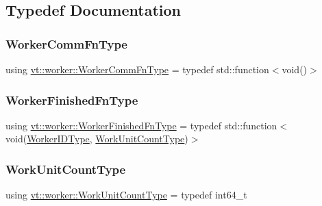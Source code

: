 \subsection{Typedef Documentation}
\mbox{\label{namespacevt_1_1worker_af5cc6dd44a4444b2e5498ca279a9f04d}} 
\subsubsection{\texorpdfstring{Worker\+Comm\+Fn\+Type}{WorkerCommFnType}}
{\footnotesize\ttfamily using \hyperlink{namespacevt_1_1worker_af5cc6dd44a4444b2e5498ca279a9f04d}{vt\+::worker\+::\+Worker\+Comm\+Fn\+Type} = typedef std\+::function$<$void()$>$}

\mbox{\label{namespacevt_1_1worker_ae32a174a5348d27aafe73c2debea1a94}} 
\subsubsection{\texorpdfstring{Worker\+Finished\+Fn\+Type}{WorkerFinishedFnType}}
{\footnotesize\ttfamily using \hyperlink{namespacevt_1_1worker_ae32a174a5348d27aafe73c2debea1a94}{vt\+::worker\+::\+Worker\+Finished\+Fn\+Type} = typedef std\+::function$<$void(\hyperlink{namespacevt_a656e362091da17b9b93d0655b36e3392}{Worker\+I\+D\+Type}, \hyperlink{namespacevt_1_1worker_a8080c49350b0520151601a8b24d6c6cf}{Work\+Unit\+Count\+Type})$>$}

\mbox{\label{namespacevt_1_1worker_a8080c49350b0520151601a8b24d6c6cf}} 
\subsubsection{\texorpdfstring{Work\+Unit\+Count\+Type}{WorkUnitCountType}}
{\footnotesize\ttfamily using \hyperlink{namespacevt_1_1worker_a8080c49350b0520151601a8b24d6c6cf}{vt\+::worker\+::\+Work\+Unit\+Count\+Type} = typedef int64\+\_\+t}

